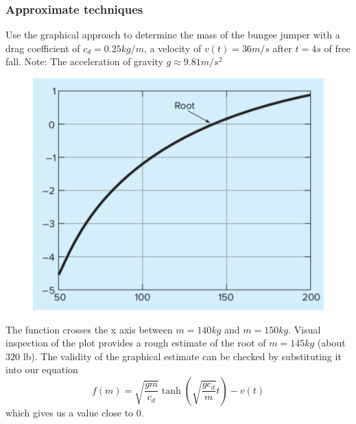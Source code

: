 \documentclass{if-beamer}
\begin{document}
\begin{frame}
\frametitle{Approximate techniques}
Use the graphical approach to determine the mass of the bungee jumper with a drag coefficient of $c_d = 0.25 kg/m$, a velocity of $v(t)=36 m/s$ after $t = 4 s$ of free fall. Note: The acceleration of gravity $g \approx 9.81 m/s^2$ \\
\vspace{5pt}
\begin{minipage}{0.5\textwidth}
	\begin{figure}
		\centering
		\includegraphics[width = \textwidth]{figures/BunjeeJumpGraph}
	\end{figure}
\end{minipage}
\begin{minipage}{0.5\textwidth}
	The function crosses the x axis between $m= 140 kg$ and $m=150 kg$. Visual inspection of the plot provides a rough estimate of the root of $m=145 kg$ (about 320 lb). The validity of the graphical estimate can be checked by substituting it into our equation
	$$f(m) = \sqrt{\frac{gm}{c_d}}\tanh\left(\sqrt{\frac{gc_d}{m}}t\right) -v(t) $$
	which gives us a value close to 0.
\end{minipage}
\end{frame}
\end{document}
